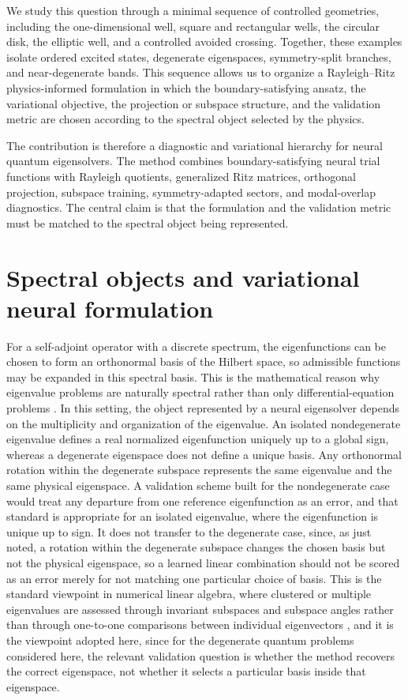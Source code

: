 \documentclass[10pt,onecolumn]{article}
\begin{document}
We study this question through a minimal sequence of controlled geometries, including the one-dimensional well, square and rectangular wells, the circular disk, the elliptic well, and a controlled avoided crossing. Together, these examples isolate ordered excited states, degenerate eigenspaces, symmetry-split branches, and near-degenerate bands. This sequence allows us to organize a Rayleigh--Ritz physics-informed formulation in which the boundary-satisfying ansatz, the variational objective, the projection or subspace structure, and the validation metric are chosen according to the spectral object selected by the physics.

The contribution is therefore a diagnostic and variational hierarchy for neural quantum eigensolvers. The method combines boundary-satisfying neural trial functions with Rayleigh quotients, generalized Ritz matrices, orthogonal projection, subspace training, symmetry-adapted sectors, and modal-overlap diagnostics. The central claim is that the formulation and the validation metric must be matched to the spectral object being represented.

\section{Spectral objects and variational neural formulation}

For a self-adjoint operator with a discrete spectrum, the eigenfunctions can be chosen to form an orthonormal basis of the Hilbert space, so admissible functions may be expanded in this spectral basis. This is the mathematical reason why eigenvalue problems are naturally spectral rather than only differential-equation problems \cite{Butkov1968, Arfken2012, CohenTannoudji1977}. In this setting, the object represented by a neural eigensolver depends on the multiplicity and organization of the eigenvalue. An isolated nondegenerate eigenvalue defines a real normalized eigenfunction uniquely up to a global sign, whereas a degenerate eigenspace does not define a unique basis. Any orthonormal rotation within the degenerate subspace represents the same eigenvalue and the same physical eigenspace. A validation scheme built for the nondegenerate case would treat any departure from one reference eigenfunction as an error, and that standard is appropriate for an isolated eigenvalue, where the eigenfunction is unique up to sign. It does not transfer to the degenerate case, since, as just noted, a rotation within the degenerate subspace changes the chosen basis but not the physical eigenspace, so a learned linear combination should not be scored as an error merely for not matching one particular choice of basis. This is the standard viewpoint in numerical linear algebra, where clustered or multiple eigenvalues are assessed through invariant subspaces and subspace angles rather than through one-to-one comparisons between individual eigenvectors \cite{DavisKahan1970,KnyazevArgentati2002}, and it is the viewpoint adopted here, since for the degenerate quantum problems considered here, the relevant validation question is whether the method recovers the correct eigenspace, not whether it selects a particular basis inside that eigenspace.
\end{document}
